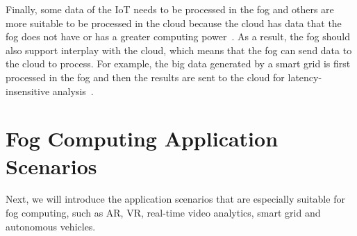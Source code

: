 \documentclass[11pt]{phdthesis}
\begin{document}
Finally, some data of the IoT needs to be processed in the fog and others are more suitable to be processed in the cloud because the cloud has data that the fog does not have or has a greater computing power~\citep{bonomi2012fog}.  As a result, the fog should also support interplay with the cloud, which means that the fog can send data to the cloud to process. For example, the big data generated by a smart grid is first processed in the fog and then the results are sent to the cloud for latency-insensitive analysis~\citep{borylo2016energy}. 

\section{Fog Computing Application Scenarios} \label{application scenarios}

Next, we will introduce the application scenarios that are especially suitable for fog computing, such as AR, VR, real-time video analytics, smart grid and autonomous vehicles. 
\end{document}
